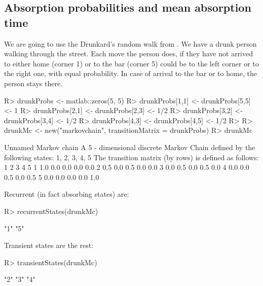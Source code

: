 \documentclass[
  nojss]{jss}
\begin{document}
\hypertarget{absorption-probabilities-and-mean-absorption-time}{%
\subsection{Absorption probabilities and mean absorption time}\label{absorption-probabilities-and-mean-absorption-time}}

We are going to use the Drunkard's random walk from \citep{GrinsteadSnell}. We have a drunk person walking through the street. Each move the person does, if they have not arrived to either home (corner 1) or to the bar (corner 5) could be to the left corner or to the right one, with equal probability. In case of arrival to the bar or to home, the person stays there.

\begin{CodeChunk}

\begin{CodeInput}
R> drunkProbs <- matlab::zeros(5, 5)
R> drunkProbs[1,1] <- drunkProbs[5,5] <- 1
R> drunkProbs[2,1] <- drunkProbs[2,3] <- 1/2
R> drunkProbs[3,2] <- drunkProbs[3,4] <- 1/2
R> drunkProbs[4,3] <- drunkProbs[4,5] <- 1/2
R> 
R> drunkMc <- new("markovchain", transitionMatrix = drunkProbs)
R> drunkMc
\end{CodeInput}

\begin{CodeOutput}
Unnamed Markov chain 
 A  5 - dimensional discrete Markov Chain defined by the following states: 
 1, 2, 3, 4, 5 
 The transition matrix  (by rows)  is defined as follows: 
    1   2   3   4   5
1 1.0 0.0 0.0 0.0 0.0
2 0.5 0.0 0.5 0.0 0.0
3 0.0 0.5 0.0 0.5 0.0
4 0.0 0.0 0.5 0.0 0.5
5 0.0 0.0 0.0 0.0 1.0
\end{CodeOutput}
\end{CodeChunk}

Recurrent (in fact absorbing states) are:

\begin{CodeChunk}

\begin{CodeInput}
R> recurrentStates(drunkMc)
\end{CodeInput}

\begin{CodeOutput}
[1] "1" "5"
\end{CodeOutput}
\end{CodeChunk}

Transient states are the rest:

\begin{CodeChunk}

\begin{CodeInput}
R> transientStates(drunkMc)
\end{CodeInput}

\begin{CodeOutput}
[1] "2" "3" "4"
\end{CodeOutput}
\end{CodeChunk}
\end{document}
